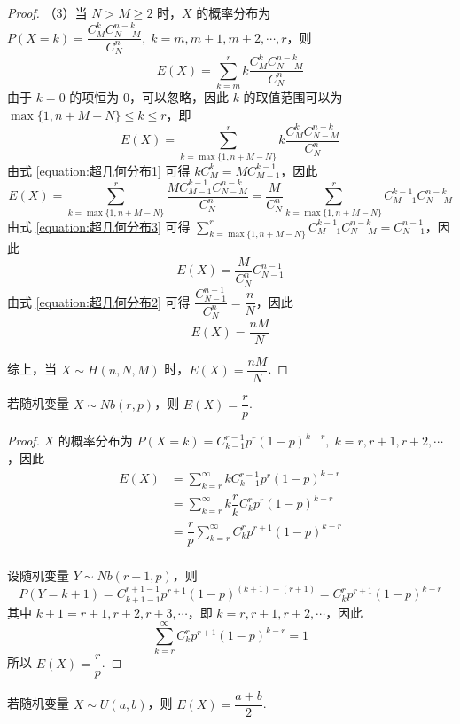 \begin{proof}
    （3）当 $N>M \geqslant 2$ 时，$X$ 的概率分布为 $P(X=k) = \dfrac{C_M^k C_{N-M}^{n-k}}{C_N^n},\; k = m, m+1, m+2, \cdots, r$，则
    $$
    E(X) = \sum_{k=m}^r k \dfrac{C_M^k C_{N-M}^{n-k}}{C_N^n}
    $$
    由于 $k=0$ 的项恒为 $0$，可以忽略，因此 $k$ 的取值范围可以为 $\max\{ 1, n+M-N \} \leqslant k \leqslant r$，即
    $$
    E(X) = \sum_{k=\max\{ 1, n+M-N \}}^r k \dfrac{C_M^k C_{N-M}^{n-k}}{C_N^n}
    $$
    由式 \eqref{equation:超几何分布1} 可得 $k C_M^k = M C_{M-1}^{k-1}$，因此
    $$
    E(X) = \sum_{k=\max\{ 1, n+M-N \}}^{r} \dfrac{M C_{M-1}^{k-1} C_{N-M}^{n-k}}{C_N^n} = \dfrac{M}{C_N^n} \sum_{k=\max\{ 1, n+M-N \}}^{r} C_{M-1}^{k-1} C_{N-M}^{n-k}
    $$
    由式 \eqref{equation:超几何分布3} 可得 $\displaystyle\sum_{k=\max\{ 1, n+M-N \}}^{r} C_{M-1}^{k-1} C_{N-M}^{n-k} = C_{N-1}^{n-1}$，因此
    $$
    E(X) = \dfrac{M}{C_N^n} C_{N-1}^{n-1}
    $$
    由式 \eqref{equation:超几何分布2} 可得 $\dfrac{C_{N-1}^{n-1}}{C_N^n} = \dfrac{n}{N}$，因此
    $$
    E(X) = \dfrac{nM}{N}
    $$

    综上，当 $X \sim H(n,N,M)$ 时，$E(X) = \dfrac{nM}{N}$.
\end{proof}

\begin{conclusion}
    \indent 若随机变量 $X \sim Nb(r,p)$，则 $E(X) = \dfrac{r}{p}$.
\end{conclusion}

\begin{proof}
    $X$ 的概率分布为 $P(X=k) = C_{k-1}^{r-1} p^r (1-p)^{k-r},\; k = r, r+1, r+2, \cdots$，因此
    $$
    \begin{aligned}
        E(X) &= \sum_{k=r}^{\infty} k C_{k-1}^{r-1} p^r (1-p)^{k-r} \\
        &= \sum_{k=r}^{\infty} k \dfrac{r}{k} C_{k}^{r} p^r (1-p)^{k-r} \\
        &= \dfrac{r}{p} \sum_{k=r}^{\infty} C_{k}^{r} p^{r+1} (1-p)^{k-r} \\
    \end{aligned}
    $$

    设随机变量 $Y \sim Nb(r+1, p)$，则
    $$
    P(Y=k+1) = C_{k+1-1}^{r+1-1} p^{r+1} (1-p)^{(k+1)-(r+1)} = C_{k}^{r} p^{r+1} (1-p)^{k-r}
    $$
    其中 $k+1 = r+1, r+2, r+3, \cdots$，即 $k = r, r+1, r+2, \cdots$，因此
    $$
    \sum_{k=r}^{\infty} C_{k}^{r} p^{r+1} (1-p)^{k-r} = 1
    $$
    所以 $E(X) = \dfrac{r}{p}$.
\end{proof}

\begin{conclusion}
    \indent 若随机变量 $X \sim U(a,b)$，则 $E(X) = \dfrac{a+b}{2}$.
\end{conclusion}

